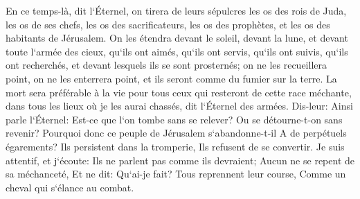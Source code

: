 \verse En ce temps-là, dit l`Éternel, on tirera de leurs sépulcres les os des rois de Juda, les os de ses chefs, les os des sacrificateurs, les os des prophètes, et les os des habitants de Jérusalem. 
\verse On les étendra devant le soleil, devant la lune, et devant toute l`armée des cieux, qu`ils ont aimés, qu`ils ont servis, qu`ils ont suivis, qu`ils ont recherchés, et devant lesquels ils se sont prosternés; on ne les recueillera point, on ne les enterrera point, et ils seront comme du fumier sur la terre. 
\verse La mort sera préférable à la vie pour tous ceux qui resteront de cette race méchante, dans tous les lieux où je les aurai chassés, dit l`Éternel des armées. 
\verse Dis-leur: Ainsi parle l`Éternel: Est-ce que l`on tombe sans se relever? Ou se détourne-t-on sans revenir? 
\verse Pourquoi donc ce peuple de Jérusalem s`abandonne-t-il A de perpétuels égarements? Ils persistent dans la tromperie, Ils refusent de se convertir. 
\verse Je suis attentif, et j`écoute: Ils ne parlent pas comme ils devraient; Aucun ne se repent de sa méchanceté, Et ne dit: Qu`ai-je fait? Tous reprennent leur course, Comme un cheval qui s`élance au combat. 

